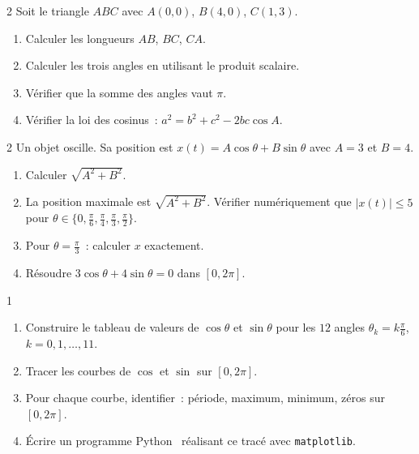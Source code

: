 \begin{probleme}{2}
Soit le triangle $ABC$ avec $A(0,0)$, $B(4,0)$, $C(1,3)$.
\begin{enumerate}
  \item Calculer les longueurs $AB$, $BC$, $CA$.
  \item Calculer les trois angles en utilisant le produit scalaire.
  \item V\'erifier que la somme des angles vaut $\pi$.
  \item V\'erifier la loi des cosinus~: $a^2=b^2+c^2-2bc\cos A$.
\end{enumerate}
\end{probleme}

\begin{probleme}{2}
Un objet oscille. Sa position est $x(t)=A\cos\theta+B\sin\theta$
avec $A=3$ et $B=4$.
\begin{enumerate}
  \item Calculer $\sqrt{A^2+B^2}$.
  \item La position maximale est $\sqrt{A^2+B^2}$. V\'erifier num\'eriquement
        que $|x(t)|\leq5$ pour $\theta\in\{0,\frac{\pi}{6},\frac{\pi}{4},\frac{\pi}{3},\frac{\pi}{2}\}$.
  \item Pour $\theta=\frac{\pi}{3}$~: calculer $x$ exactement.
  \item R\'esoudre $3\cos\theta+4\sin\theta=0$ dans {$[0,2\pi]$}.
\end{enumerate}
\end{probleme}

\begin{probleme}{1}
\begin{enumerate}
  \item Construire le tableau de valeurs de $\cos\theta$ et $\sin\theta$
        pour les $12$ angles $\theta_k = k\frac{\pi}{6}$, $k=0,1,\ldots,11$.
  \item Tracer les courbes de $\cos$ et $\sin$ sur $[0,2\pi]$.
  \item Pour chaque courbe, identifier~: p\'eriode, maximum, minimum,
        z\'eros sur $[0,2\pi]$.
  \item \'Ecrire un programme Python \computer\ r\'ealisant ce trac\'e
        avec \texttt{matplotlib}.
\end{enumerate}
\end{probleme}

